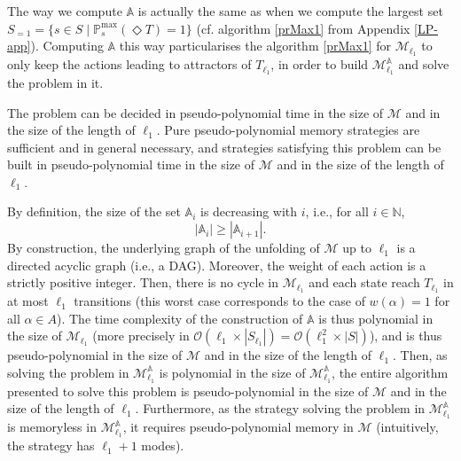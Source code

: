 The way we compute $\mathbb{A}$ is actually the same
as when we compute the largest set $S_{=1} = \{ s \in S \; | \; \mathbb{P}^{\max}_s(\Diamond T) = 1 \}$ (cf. algorithm \ref{prMax1} from Appendix \ref{LP-app}).
Computing $\mathbb{A}$ this way particularises the algorithm \ref{prMax1} for $\mathcal{M}_{\ell_1}$ to only keep the actions leading to attractors of $T_{\ell_1}$, in order to build $\mathcal{M}^\mathbb{A}_{\ell_1}$ and solve the \SSPE{} problem in it.

\begin{theorem}
  The \SSPWE{} problem can be decided in pseudo-polynomial time in the size of $\mathcal{M}$ and in the size of the length of $\ell_1$.
  Pure pseudo-polynomial memory strategies are sufficient and in general necessary, and strategies satisfying this problem can be built in pseudo-polynomial time in the size of $\mathcal{M}$ and in the size of the length of $\ell_1$.
\end{theorem}

By definition, the size of the set $\mathbb{A}_i$ is decreasing with $i$, i.e., for all $i \in \mathbb{N}$,
\[
  | \mathbb{A}_i | \geq | \mathbb{A}_{i+1} |.
\]
By construction, the underlying graph of the unfolding of $\mathcal{M}$ up to $\ell_1$ is a directed acyclic graph (i.e., a DAG). Moreover, the weight of each action is a strictly positive integer. Then, there is no cycle in $\mathcal{M}_{\ell_1}$ and each state reach $T_{\ell_1}$ in at most $\ell_1$ transitions (this worst case corresponds to the case of $w(\alpha)=1$ for all $\alpha \in A$).
The time complexity of the construction of $\mathbb{A}$ is thus polynomial in the size of $\mathcal{M}_{\ell_1}$ (more precisely in $\mathcal{O}(\ell_1 \times |S_{\ell_1}|) = \mathcal{O}(\ell_1^2 \times |S|)$), and is thus pseudo-polynomial in the size of $\mathcal{M}$ and in the size of the length of $\ell_1$. Then, as solving the \SSPE{} problem in $\mathcal{M}^\mathbb{A}_{\ell_1}$ is polynomial in the size of $\mathcal{M}^\mathbb{A}_{\ell_1}$,
the entire algorithm presented to solve this problem is pseudo-polynomial in the size of $\mathcal{M}$ and in the size of the length of $\ell_1$.
Furthermore, as the strategy solving the \SSPE{} problem in $\mathcal{M}_{\ell_1}^\mathbb{A}$ is memoryless in $\mathcal{M}_{\ell_1}^\mathbb{A}$, it requires pseudo-polynomial memory in $\mathcal{M}$ (intuitively, the strategy has $\ell_1 + 1$ modes).

